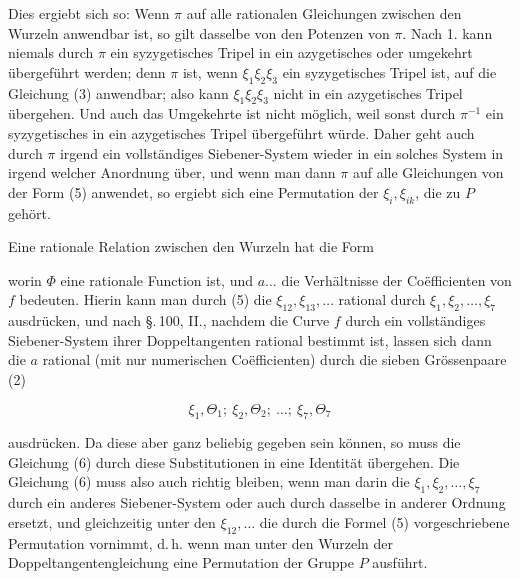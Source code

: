
Dies ergiebt sich so: Wenn $\pi$ auf alle rationalen Gleichungen zwischen den Wurzeln anwendbar ist, so gilt dasselbe von den Potenzen von $\pi$. Nach 1. kann niemals durch $\pi$ ein syzygetisches Tripel in ein azygetisches oder umgekehrt übergeführt werden; denn $\pi$ ist, wenn $\xi_1\xi_2\xi_3$ ein syzygetisches Tripel ist, auf die Gleichung (3) anwendbar; also kann $\xi_1\xi_2\xi_3$ nicht in ein azygetisches Tripel übergehen. Und auch das Umgekehrte ist nicht möglich, weil sonst durch $\pi^{-1}$ ein syzygetisches in ein azygetisches Tripel übergeführt würde. Daher geht auch durch $\pi$ irgend ein vollständiges Siebener-System wieder in ein solches System in irgend welcher Anordnung über, und wenn man dann $\pi$ auf alle Gleichungen von der Form (5) anwendet, so ergiebt sich eine Permutation der $\xi_i, \xi_{ik}$, die zu $P$ gehört.


Eine rationale Relation zwischen den Wurzeln hat die Form


worin $\Phi$ eine rationale Function ist, und $a\dots$ die Verhältnisse der Coëfficienten von $f$ bedeuten. Hierin kann man durch (5) die $\xi_{12},\xi_{13},\dots$ rational durch $\xi_1,\xi_2,\dots,\xi_7$ ausdrücken, und nach \S.\,100, II., nachdem die Curve $f$ durch ein vollständiges Siebener-System ihrer Doppeltangenten rational bestimmt ist, lassen sich dann die $a$ rational (mit nur numerischen Coëfficienten) durch die sieben Grössenpaare (2)

\[
\xi_1, \Theta_1;\ \xi_2, \Theta_2;\ \dots;\ \xi_7, \Theta_7
\]

ausdrücken. Da diese aber ganz beliebig gegeben sein können, so muss die Gleichung (6) durch diese Substitutionen in eine Identität übergehen. Die Gleichung (6) muss also auch richtig bleiben, wenn man darin die $\xi_1,\xi_2,\dots,\xi_7$ durch ein anderes Siebener-System oder auch durch dasselbe in anderer Ordnung ersetzt, und gleichzeitig unter den $\xi_{12},\dots$ die durch die Formel (5) vorgeschriebene Permutation vornimmt, d.\,h. wenn man unter den Wurzeln der Doppeltangentengleichung eine Permutation der Gruppe $P$ ausführt.
